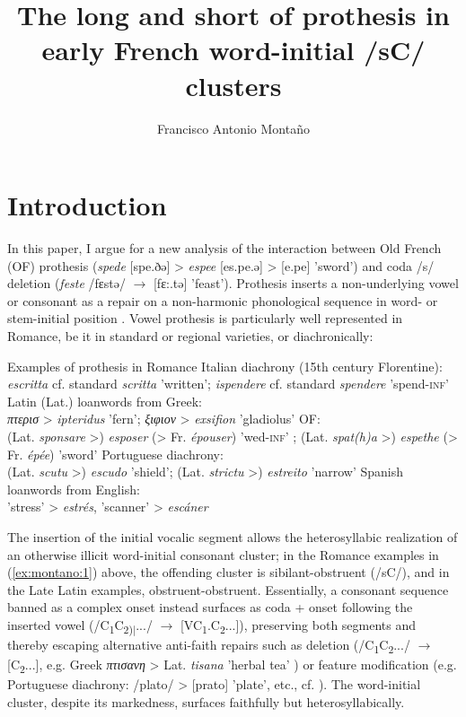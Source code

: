 \documentclass[output=paper,colorlinks,citecolor=brown,
]{langscibook}
\author{Francisco Antonio Monta\~no \affiliation{Lehman College, City University of New York (CUNY)}}
\title{The long and short of prothesis in early French word-initial /sC/ clusters}
\begin{document}
\maketitle
\section{Introduction}
	In this paper, I argue for a new analysis of the interaction between Old French (OF) prothesis (\textit{spede} [spe.ðə] > \textit{espee} [es.pe.ə] > [e.pe] 'sword') and coda /s/ deletion (\textit{feste} /fɛstə/ $\rightarrow$ [fɛ:.tə] 'feast').  Prothesis inserts a non-underlying vowel or consonant as a repair on a non-harmonic phonological sequence in word- or stem-initial position \citep{Sampson2010}.  Vowel prothesis is particularly well represented in Romance, be it in standard or regional varieties, or diachronically:

\ea \label{ex:montano:1}
	Examples of prothesis in Romance
\ea Italian diachrony (15th century Florentine):\\\textit{escritta} cf. standard \textit{scritta} 'written'; \textit{ispendere} cf. standard \textit{spendere} 'spend-\textsc{inf}' \citep{Sampson2003}
\ex Latin (Lat.) loanwords from Greek:\\\textit{πτερισ} > \textit{ipteridus} 'fern'; \textit{ξιφιον} > \textit{exsifion} 'gladiolus' \citep{Passino2013}
\ex OF:\\(Lat. \textit{sponsare} >) \textit{esposer} (> Fr. \textit{épouser}) 'wed-\textsc{inf}' \citep{Pope1952}; (Lat. \textit{spat(h)a} >) \textit{espethe} (> Fr. \textit{épée}) 'sword' \citep{Sampson2010}
\ex Portuguese diachrony:\\(Lat. \textit{scutu} >) \textit{escudo} 'shield'; (Lat. \textit{strictu} >) \textit{estreito} 'narrow' \citep{Lief2006}
\ex Spanish loanwords from English:\\'stress' > \textit{estrés}, 'scanner' > \textit{escáner} \citep{BernáSicilia2011}
\z\z

\noindent The insertion of the initial vocalic segment allows the heterosyllabic realization of an otherwise illicit word-initial consonant cluster; in the Romance examples in (\ref{ex:montano:1}) above, the offending cluster is sibilant-obstruent (/sC/), and in the Late Latin examples, obstruent-obstruent.  Essentially, a consonant sequence banned as a complex onset instead surfaces as coda + onset following the inserted vowel (/C\textsubscript{1}C\textsubscript{2)|}.../ $\rightarrow$ [VC\textsubscript{1}.C\textsubscript{2}...]), preserving both segments and thereby escaping alternative anti-faith repairs such as deletion (/C\textsubscript{1}C\textsubscript{2}.../ $\rightarrow$ [C\textsubscript{2}...], e.g. Greek \textit{πτισανη} > Lat. \textit{tisana} 'herbal tea' \citep{Passino2013}) or feature modification (e.g. Portuguese diachrony: /plato/ > [prato] 'plate', etc., cf. \citet[116--118]{Lief2006}).  The word-initial cluster, despite its markedness, surfaces faithfully but heterosyllabically.
\end{document}
